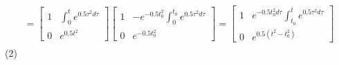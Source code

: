 \documentclass{article}
\begin{document}
$$\begin{aligned}
\begin{array}{l}
=\left[\begin{array}{ll}
1 & \int_{0}^{t} e^{0.5 \tau^{2} d \tau} \\
0 & e^{0.5 t^{2}}
\end{array}\right]\left[\begin{array}{ll}
1 & -e^{-0.5t_{0}^{2}}\int_{0}^{t_{0}} e^{0.5 \tau^{2} d \tau} \\
0 & e^{-0.5 t_{0}^{2}}
\end{array}\right]
=\left[\begin{array}{ll}
1 & e^{-0.5 t_{0}^{2} d \tau} \int_{t_{0}}^{t} e^{0.5 \tau^{2} d \tau} \\
0 & e^{0.5\left(t^{2}-t_{0}^{2}\right)}
\end{array}\right]
\end{array}
\end{aligned}
$$
(2)
\end{document}
